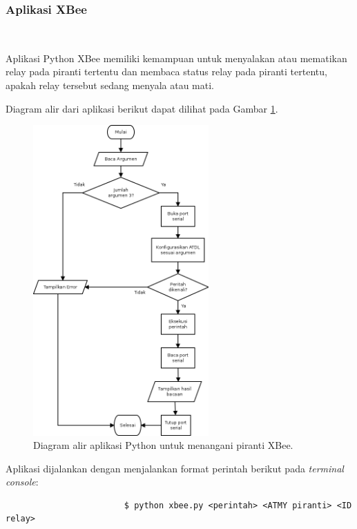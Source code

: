 			\subsubsection{Aplikasi XBee}\

				Aplikasi Python XBee memiliki kemampuan untuk menyalakan atau mematikan relay pada piranti tertentu dan membaca status relay pada piranti tertentu, apakah relay tersebut sedang menyala atau mati.

				Diagram alir dari aplikasi berikut dapat dilihat pada Gambar \ref{python-xbee}.

				\begin{figure}[H]
				  \centering
				    \includegraphics[width=0.6\textwidth]{gambar/python-xbee}
				    \caption{Diagram alir aplikasi Python untuk menangani piranti XBee.}
				    \label{python-xbee}
				\end{figure}

				Aplikasi dijalankan dengan menjalankan format perintah berikut pada \emph{terminal console}:
				\begingroup
				    \fontsize{10pt}{12pt}\selectfont
				    \begin{verbatim}
						$ python xbee.py <perintah> <ATMY piranti> <ID relay>
				    \end{verbatim}  
				\endgroup

